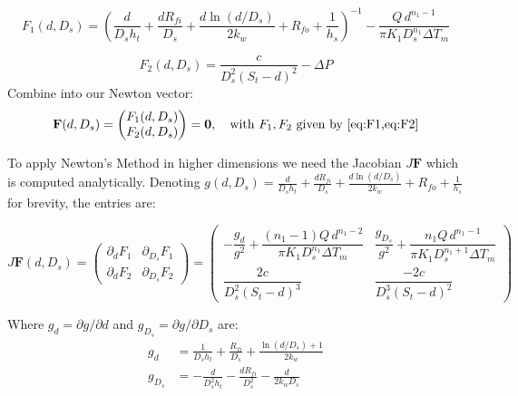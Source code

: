 \documentclass[11pt, a4paper]{article}
\theoremstyle{definition}
\begin{document}
\begin{equation}
  F_1(d, D_s) = \left(
      \frac{d}{D_s h_t} + \frac{d R_{fi}}{D_s}
      + \frac{d \ln(d/D_s)}{2k_w} + R_{fo} + \frac{1}{h_s}
    \right)^{-1}
    - \frac{Q\, d^{n_1-1}}{\pi K_1 D_s^{n_1} \Delta T_m}
  \label{eq:F1}
\end{equation}

\begin{equation}
  F_2(d, D_s) = \frac{c}{D_s^2(S_t - d)^2} - \Delta P
  \label{eq:F2}
\end{equation}
Combine into our Newton vector:
\begin{equation}
  \mathbf{F}(d, D_s) =
  \begin{pmatrix} F_1(d, D_s) \\ F_2(d, D_s) \end{pmatrix} = \mathbf{0},
  \quad \text{with } F_1, F_2 \text{ given by \cref{eq:F1,eq:F2}}
  \label{eq:system}
\end{equation}

To apply Newton's Method in higher dimensions we need the Jacobian $J\mathbf{F}$ which is computed analytically. Denoting
$g(d, D_s) = \frac{d}{D_s h_t} + \frac{d R_{fi}}{D_s}
+ \frac{d \ln(d/D_s)}{2k_w} + R_{fo} + \frac{1}{h_s}$
for brevity, the entries are:

\begin{equation}
  J\mathbf{F}(d, D_s) =
\begin{pmatrix}
  \partial_d F_1      & \partial_{D_s} F_1 \\[6pt]
  \partial_d F_2      & \partial_{D_s} F_2
\end{pmatrix}
  =
  \begin{pmatrix}
    -\dfrac{g_d}{g^2} + \dfrac{(n_1-1)Q\,d^{n_1-2}}{\pi K_1 D_s^{n_1} \Delta T_m}
    &
    \dfrac{g_{D_s}}{g^2} + \dfrac{n_1 Q\, d^{n_1-1}}{\pi K_1 D_s^{n_1+1} \Delta T_m}
    \\[12pt]
    \dfrac{2c}{D_s^2(S_t - d)^3}
    &
    \dfrac{-2c}{D_s^3(S_t - d)^2}
  \end{pmatrix}
  \label{eq:jacobian}
\end{equation}

Where $g_d = \partial g/\partial d$ and $g_{D_s} = \partial g / \partial D_s$ are:
\begin{align}
  g_d     &= \frac{1}{D_s h_t} + \frac{R_{fi}}{D_s} + \frac{\ln(d/D_s) + 1}{2k_w} \\[6pt]
  g_{D_s} &= -\frac{d}{D_s^2 h_t} - \frac{d R_{fi}}{D_s^2} - \frac{d}{2k_w D_s}
\end{align}
\end{document}
